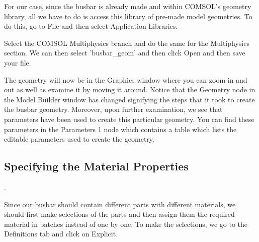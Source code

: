 For our case, since the busbar is already made and within COMSOL's geometry library, all we have to do is access this library of pre-made model geometries. To do this, go to File and then select Application Libraries.


Select the COMSOL Multiphysics branch and do the same for the Multiphysics section. We can then select 'busbar\_geom' and then click Open and then save your file.


The geometry will now be in the Graphics window where you can zoom in and out as well as examine it by moving it around. Notice that the Geometry node in the Model Builder window has changed signifying the steps that it took to create the busbar geometry. Moreover, upon further examination, we see that parameters have been used to create this particular geometry. You can find these parameters in the Parameters 1 node which contains a table which lists the editable parameters used to create the geometry.


\subsection{Specifying the Material Properties}.

Since our busbar should contain different parts with different materials, we should first make selections of the parts and then assign them the required material in batches instead of one by one. To make the selections, we go to the Definitions tab and click on Explicit.


